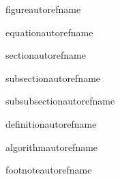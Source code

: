 
\ifcsname figureautorefname\endcsname
\renewcommand*{\figureautorefname}{Fig.}
\else
\newcommand*{\figureautorefname}{Fig.}
\fi

\ifcsname equationautorefname\endcsname
\renewcommand*{\equationautorefname}{Eq.}
\else
\newcommand*{\equationautorefname}{Eq.}
\fi

\ifcsname sectionautorefname\endcsname
\renewcommand*{\sectionautorefname}{Sec.}
\else
\newcommand*{\sectionautorefname}{Sec.}
\fi

\ifcsname subsectionautorefname\endcsname
\renewcommand*{\subsectionautorefname}{Sec.}
\else
\newcommand*{\subsectionautorefname}{Sec.}
\fi

\ifcsname subsubsectionautorefname\endcsname
\renewcommand*{\subsubsectionautorefname}{Sec.}
\else
\newcommand*{\subsubsectionautorefname}{Sec.}
\fi

\ifcsname definitionautorefname\endcsname
\renewcommand*{\definitionautorefname}{Def.}
\else
\newcommand*{\definitionautorefname}{Def.}
\fi

\ifcsname algorithmautorefname\endcsname
\renewcommand*{\algorithmautorefname}{Alg.}
\else
\newcommand{\algorithmautorefname}{Alg.}
\fi

\ifcsname footnoteautorefname\endcsname
\renewcommand*{\footnoteautorefname}{Footnote}
\else
\newcommand*{\footnoteautorefname}{Footnote}
\fi

\makeatletter
{}
\newcommand{\ALG@lineautorefname}{Line}
\makeatother
